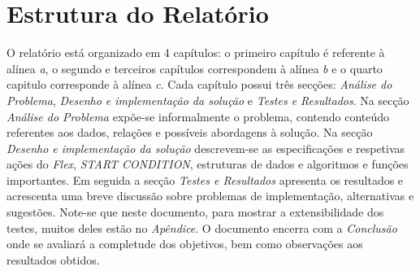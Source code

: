 \section*{Estrutura do Relatório} 
O relatório está organizado em 4 capítulos: o primeiro capítulo é referente
à alínea \emph{a}, o segundo e terceiros capítulos correspondem à alínea
\emph{b} e o quarto capitulo corresponde à alínea \emph{c}.  Cada capítulo
possui três secções: \emph{Análise do Problema}, \emph{Desenho e implementação
da solução} e \emph{Testes e Resultados}.  Na secção \emph{Análise do Problema}
expõe-se informalmente o problema, contendo conteúdo referentes aos dados,
relações e possíveis abordagens à solução. Na secção \emph{Desenho
e implementação da solução} descrevem-se as especificações e respetivas ações do
\emph{Flex}, \emph{START CONDITION}, estruturas de dados e algoritmos e funções
importantes. Em seguida a secção \emph{Testes e Resultados} apresenta os
resultados e acrescenta uma breve discussão sobre problemas de implementação,
alternativas e sugestões.  Note-se que neste documento, para mostrar
a extensibilidade dos testes, muitos deles estão no \emph{Apêndice}. O documento
encerra com a \emph{Conclusão} onde se avaliará a completude dos objetivos, bem
como observações aos resultados obtidos.




